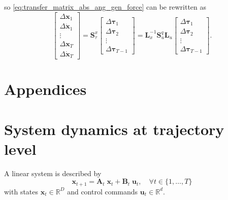 \documentclass[10pt,a4paper]{article} %
\begin{document}
so \eqref{eq:transfer_matrix_abs_ang_gen_force} can be rewritten as
\begin{equation*}
    \begin{bmatrix}
    \Delta \bm{x}_1 \\ \Delta \bm{\dot{x}}_1 \\ \vdots \\ \Delta \bm{x}_T \\ \Delta \bm{\dot{x}}_T
	\end{bmatrix} = \bm{S}_{\tau}^x \begin{bmatrix}
	\Delta \bm{\tau}_1 \\ \Delta \bm{\tau}_2 \\ \vdots \\ \Delta \bm{\tau}_{T-1}
	\end{bmatrix}  = \bm{L}_x^{-1} \bm{S}_u^q \bm{L}_u \begin{bmatrix}
	\Delta \bm{\tau}_1 \\ \Delta \bm{\tau}_2 \\ \vdots \\ \Delta \bm{\tau}_{T-1}
	\end{bmatrix}. 
\end{equation*}

\newpage




\clearpage
\appendix
\section*{Appendices}


\section{System dynamics at trajectory level}\label{app:Su}

A linear system is described by 
\begin{equation*}
	\bm{x}_{t+1} = \bm{A}_t \; \bm{x}_t + \bm{B}_t \; \bm{u}_t, \quad\forall t\in\{1,\ldots,T\}
	\label{eq:AB}
\end{equation*}
with states $\bm{x}_t\!\in\!\mathbb{R}^{D}$ and control commands $\bm{u}_t\!\in\!\mathbb{R}^{d}$.
\end{document}
